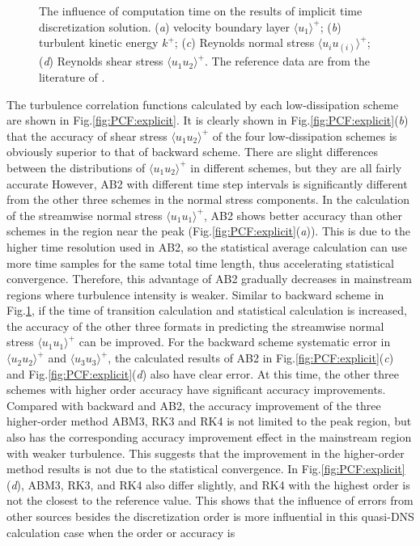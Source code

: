 \documentclass{article}
\begin{document}
\begin{figure}
	\centering
	\caption{The influence of computation time on the results of implicit time discretization solution. (\textit{a}) velocity boundary layer $\langle u_1 \rangle^+$; (\textit{b}) turbulent kinetic energy $k^+$; (\textit{c}) Reynolds normal stress $\langle u_{i}u_{(i)} \rangle^+$; (\textit{d}) Reynolds shear stress $\langle u_{1}u_{2} \rangle^+$. The reference data are from the literature of \citet{Kim:1987}.}
	\label{fig:PCF:implicit}
\end{figure}

The turbulence correlation functions calculated by each low-dissipation scheme are shown in Fig.\ref{fig:PCF:explicit}. It is clearly shown in Fig.\ref{fig:PCF:explicit}(\textit{b}) that the accuracy of shear stress $\langle u_{1}u_{2} \rangle^+$ of the four low-dissipation schemes is obviously superior to that of backward scheme. There are slight differences between the distributions of $\langle u_{1}u_{2} \rangle^+$ in different schemes, but they are all fairly accurate However, AB2 with different time step intervals is significantly different from the other three schemes in the normal stress components. In the calculation of the streamwise normal stress $\langle u_{1}u_{1} \rangle^+$, AB2 shows better accuracy than other schemes in the region near the peak (Fig.\ref{fig:PCF:explicit}(\textit{a})). This is due to the higher time resolution used in AB2, so the statistical average calculation can use more time samples for the same total time length, thus accelerating statistical convergence. Therefore, this advantage of AB2 gradually decreases in mainstream regions where turbulence intensity is weaker. Similar to backward scheme in Fig.\ref{fig:PCF:implicit}, if the time of transition calculation and statistical calculation is increased, the accuracy of the other three formats in predicting the streamwise normal stress $\langle u_{1}u_{1} \rangle^+$ can be improved. For the backward scheme systematic error in $\langle u_{2}u_{2} \rangle^+$ and $\langle u_{3}u_{3} \rangle^+$, the calculated results of AB2 in Fig.\ref{fig:PCF:explicit}(\textit{c}) and Fig.\ref{fig:PCF:explicit}(\textit{d}) also have clear error. At this time, the other three schemes with higher order accuracy have significant accuracy improvements. Compared with backward and AB2, the accuracy improvement of the three higher-order method ABM3, RK3 and RK4 is not limited to the peak region, but also has the corresponding accuracy improvement effect in the mainstream region with weaker turbulence. This suggests that the improvement in the higher-order method results is not due to the statistical convergence. In Fig.\ref{fig:PCF:explicit}(\textit{d}), ABM3, RK3, and RK4 also differ slightly, and RK4 with the highest order is not the closest to the reference value. This shows that the influence of errors from other sources besides the discretization order is more influential in this quasi-DNS calculation case when the order or accuracy is 
\end{document}

